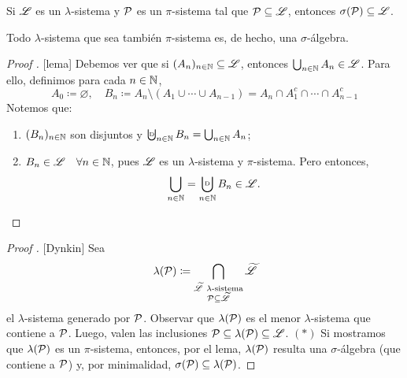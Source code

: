 \begin{theorem}
	Si $\mathscr{L}$ es un $\lambda$-sistema y $\mathcal{P}$ es un $\pi$-sistema tal que $\mathcal{P} \subseteq \mathscr{L}$, entonces $\sigma(\mathcal{P}) \subseteq \mathscr{L}$.
\end{theorem}

\begin{lemma}
	Todo $\lambda$-sistema que sea también $\pi$-sistema es, de hecho, una $\sigma$-álgebra.
\end{lemma}

\begin{proof}[Proof ][lema]
	Debemos ver que si $(A_n)_{n\in\mathbb{N}} \subseteq \mathscr{L}$, entonces $\bigcup_{n\in\mathbb{N}} A_n \in \mathscr{L}$. Para ello, definimos para cada $n\in\mathbb{N}$,
	\[ A_{0} \coloneq \varnothing, \quad B_{n} \coloneq A_{n} \setminus (A_{1} \cup \cdots \cup A_{n-1}) = A_{n} \cap A_{1}^{c} \cap \cdots \cap A_{n-1}^{c} \]
	Notemos que:
	\begin{enumerate}
		\item $(B_n)_{n\in\mathbb{N}}$ son disjuntos y $\textbigcupd_{n\in\N} B_n = \bigcup_{n\in\N} A_n$;

		\item $B_n \in \mathscr{L} \quad \forall n \in \mathbb{N}$, pues $\mathscr{L}$ es un $\lambda$-sistema y $\pi$-sistema. Pero entonces,
		\[ \bigcup_{n\in\N} = \bigcupd_{n\in\N} B_n \in \mscr{L}. \]
	\end{enumerate}
\end{proof}

\begin{proof}[Proof ][Dynkin]
	Sea 
	\[ \lambda(\mathcal{P}) \coloneq \bigcap_{\substack{\widetilde{\mathscr{L}} \ \lambda \text{-sistema} \\
	\mathcal{P} \subseteq \widetilde{\mathscr{L}}}} \widetilde{\mathscr{L}} \]
	el $\lambda$-sistema generado por $\mathcal{P}$. Observar que $\lambda(\mathcal{P})$ es el menor $\lambda$-sistema que contiene a $\mathcal{P}$. Luego, valen las inclusiones $\mathcal{P} \subseteq \lambda(\mathcal{P}) \subseteq \mathscr{L}$. $(*)$ Si mostramos que $\lambda(\mathcal{P})$ es un $\pi$-sistema, entonces, por el lema, $\lambda(\mathcal{P})$ resulta una $\sigma$-álgebra (que contiene a $\mathcal{P}$) y, por minimalidad, $\sigma(\mathcal{P}) \subseteq \lambda(\mathcal{P})$.
\end{proof}
